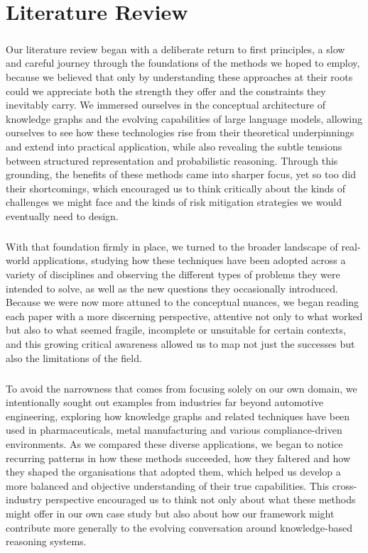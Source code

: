 \chapter{Literature Review}

    \paragraph{} Our literature review began with a deliberate return to first principles, a slow and careful journey through the foundations of the methods we hoped to employ, because we believed that only by understanding these approaches at their roots could we appreciate both the strength they offer and the constraints they inevitably carry. We immersed ourselves in the conceptual architecture of knowledge graphs and the evolving capabilities of large language models, allowing ourselves to see how these technologies rise from their theoretical underpinnings and extend into practical application, while also revealing the subtle tensions between structured representation and probabilistic reasoning. Through this grounding, the benefits of these methods came into sharper focus, yet so too did their shortcomings, which encouraged us to think critically about the kinds of challenges we might face and the kinds of risk mitigation strategies we would eventually need to design.
    
    \paragraph{} With that foundation firmly in place, we turned to the broader landscape of real-world applications, studying how these techniques have been adopted across a variety of disciplines and observing the different types of problems they were intended to solve, as well as the new questions they occasionally introduced. Because we were now more attuned to the conceptual nuances, we began reading each paper with a more discerning perspective, attentive not only to what worked but also to what seemed fragile, incomplete or unsuitable for certain contexts, and this growing critical awareness allowed us to map not just the successes but also the limitations of the field.

    \paragraph{} To avoid the narrowness that comes from focusing solely on our own domain, we intentionally sought out examples from industries far beyond automotive engineering, exploring how knowledge graphs and related techniques have been used in pharmaceuticals, metal manufacturing and various compliance-driven environments. As we compared these diverse applications, we began to notice recurring patterns in how these methods succeeded, how they faltered and how they shaped the organisations that adopted them, which helped us develop a more balanced and objective understanding of their true capabilities. This cross-industry perspective encouraged us to think not only about what these methods might offer in our own case study but also about how our framework might contribute more generally to the evolving conversation around knowledge-based reasoning systems.

